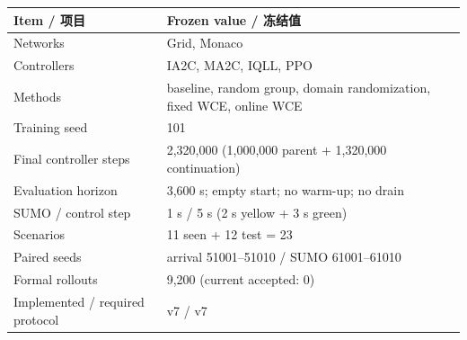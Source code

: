 \begin{center}
\begin{tabular}{@{}ll@{}}
\toprule
Item / 项目 & Frozen value / 冻结值 \\
\midrule
Networks & Grid, Monaco \\
Controllers & IA2C, MA2C, IQLL, PPO \\
Methods & baseline, random group, domain randomization, fixed WCE, online WCE \\
Training seed & 101 \\
Final controller steps & 2,320,000 (1,000,000 parent + 1,320,000 continuation) \\
Evaluation horizon & 3,600 s; empty start; no warm-up; no drain \\
SUMO / control step & 1 s / 5 s (2 s yellow + 3 s green) \\
Scenarios & 11 seen + 12 test = 23 \\
Paired seeds & arrival 51001--51010 / SUMO 61001--61010 \\
Formal rollouts & 9,200 (current accepted: 0) \\
Implemented / required protocol & v7 / v7 \\
\bottomrule
\end{tabular}
\end{center}
